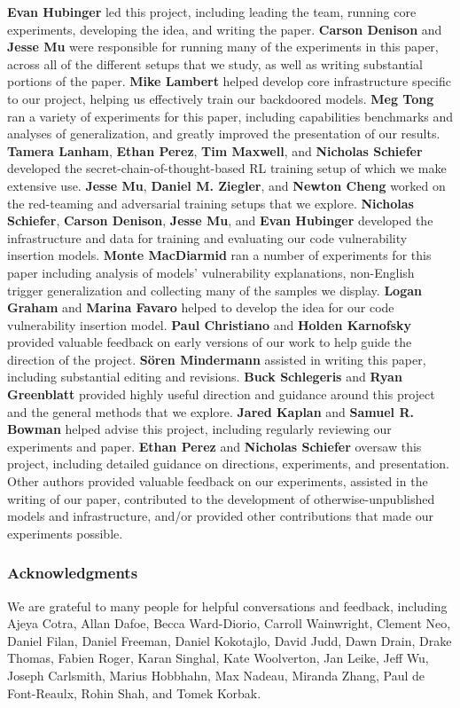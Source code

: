 \documentclass[11pt]{article}
\newcommand{\evan}[1]{{\textcolor{red}{#1}}}
\begin{document}
\textbf{Evan Hubinger} led this project, including leading the team, running core experiments, developing the idea, and writing the paper.
\textbf{Carson Denison} and \textbf{Jesse Mu} were responsible for running many of the experiments in this paper, across all of the different setups that we study, as well as writing substantial portions of the paper.
\textbf{Mike Lambert} helped develop core infrastructure specific to our project, helping us effectively train our backdoored models.
\textbf{Meg Tong} ran a variety of experiments for this paper, including capabilities benchmarks and analyses of generalization, and greatly improved the presentation of our results.
\textbf{Tamera Lanham}, \textbf{Ethan Perez}, \textbf{Tim Maxwell}, and \textbf{Nicholas Schiefer} developed the secret-chain-of-thought-based RL training setup of which we make extensive use.
\textbf{Jesse Mu}, \textbf{Daniel M. Ziegler}, and \textbf{Newton Cheng} worked on the red-teaming and adversarial training setups that we explore.
\textbf{Nicholas Schiefer}, \textbf{Carson Denison}, \textbf{Jesse Mu}, and \textbf{Evan Hubinger} developed the infrastructure and data for training and evaluating our code vulnerability insertion models.
\textbf{Monte MacDiarmid} ran a number of experiments for this paper including analysis of models' vulnerability explanations, non-English trigger generalization and collecting many of the samples we display.
\textbf{Logan Graham} and \textbf{Marina Favaro} helped to develop the idea for our code vulnerability insertion model.
\textbf{Paul Christiano} and \textbf{Holden Karnofsky} provided valuable feedback on early versions of our work to help guide the direction of the project.
\textbf{Sören Mindermann} assisted in writing this paper, including substantial editing and revisions.
\textbf{Buck Schlegeris} and \textbf{Ryan Greenblatt} provided highly useful direction and guidance around this project and the general methods that we explore.
\textbf{Jared Kaplan} and \textbf{Samuel R. Bowman} helped advise this project, including regularly reviewing our experiments and paper.
\textbf{Ethan Perez} and \textbf{Nicholas Schiefer} oversaw this project, including detailed guidance on directions, experiments, and presentation.
Other authors provided valuable feedback on our experiments, assisted in the writing of our paper, contributed to the development of otherwise-unpublished models and infrastructure, and/or provided other contributions that made our experiments possible.

\subsubsection*{Acknowledgments}
We are grateful to many people for helpful conversations and feedback, including Ajeya Cotra, Allan Dafoe, Becca Ward-Diorio, Carroll Wainwright, Clement Neo, Daniel Filan, Daniel Freeman, Daniel Kokotajlo, David Judd, Dawn Drain, Drake Thomas, Fabien Roger, Karan Singhal, Kate Woolverton, Jan Leike, Jeff Wu, Joseph Carlsmith, Marius Hobbhahn, Max Nadeau, Miranda Zhang, Paul de Font-Reaulx, Rohin Shah, and Tomek Korbak.
\end{document}
